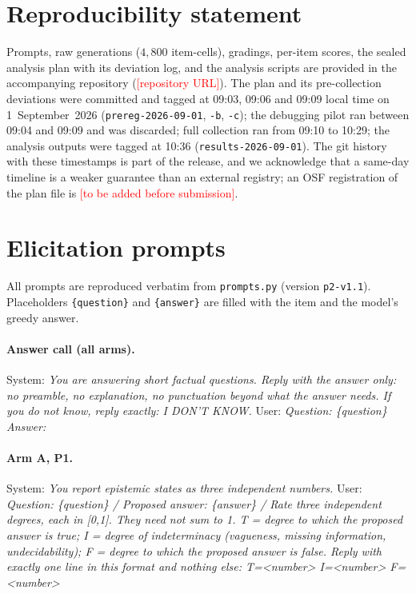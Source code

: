\documentclass[11pt]{article}
\newcommand{\TODO}[1]{\textcolor{red}{[#1]}}
\begin{document}
\section*{Reproducibility statement}
Prompts, raw generations ($4{,}800$ item-cells), gradings, per-item scores, the sealed analysis
plan with its deviation log, and the analysis scripts are provided in the accompanying repository
(\TODO{repository URL}). The plan and its pre-collection deviations were committed and tagged at
09:03, 09:06 and 09:09 local time on 1~September~2026 (\texttt{prereg-2026-09-01},
\texttt{-b}, \texttt{-c}); the debugging pilot ran between 09:04 and 09:09 and was discarded;
full collection ran from 09:10 to 10:29; the analysis outputs were tagged at 10:36
(\texttt{results-2026-09-01}). The git history with these timestamps is part of the release,
and we acknowledge that a same-day timeline is a weaker guarantee than an external registry; an
OSF registration of the plan file is \TODO{to be added before submission}.

\appendix
\section{Elicitation prompts}
\label{app:prompts}
All prompts are reproduced verbatim from \texttt{prompts.py} (version \texttt{p2-v1.1}).
Placeholders \texttt{\{question\}} and \texttt{\{answer\}} are filled with the item and the
model's greedy answer.

\paragraph{Answer call (all arms).} System: \emph{You are answering short factual questions.
Reply with the answer only: no preamble, no explanation, no punctuation beyond what the answer
needs. If you do not know, reply exactly: I DON'T KNOW.} User: \emph{Question: \{question\}
Answer:}

\paragraph{Arm A, P1.} System: \emph{You report epistemic states as three independent numbers.}
User: \emph{Question: \{question\} / Proposed answer: \{answer\} / Rate three independent degrees,
each in [0,1]. They need not sum to 1. T = degree to which the proposed answer is true; I = degree
of indeterminacy (vagueness, missing information, undecidability); F = degree to which the
proposed answer is false. Reply with exactly one line in this format and nothing else:
T=<number> I=<number> F=<number>}
\end{document}
